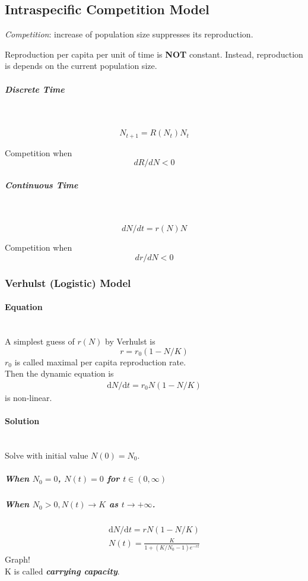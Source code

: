 \newpage
\subsection{Intraspecific Competition Model}

\emph{Competition}: increase of population size suppresses its reproduction.

\begin{assumption}
    Reproduction per capita per unit of time is \textbf{NOT} constant. Instead, reproduction is depends on the current population size.
\end{assumption}

\subparagraph{Discrete Time}~{
    $$
    N_{t+1} = R(N_t)N_t
    $$
    \par{Competition when}
    $$
    dR/dN <0
    $$
}
\subparagraph{Continuous Time}~{
    $$
    dN/dt = r(N)N
    $$
    \par{Competition when}
    $$
    dr/dN <0
    $$
}

\subsubsection{Verhulst (Logistic) Model}
\paragraph{Equation}~{}\\
A simplest guess of $r(N)$ by Verhulst is 
$$
r=r_{0}(1-N / K)
$$
$r_0$ is called maximal per capita reproduction rate.\\
Then the dynamic equation is
\begin{align}
    \mathrm{d} N / \mathrm{d} t=r_{0} N(1-N / K) \label{eq1.7}
\end{align}
 is non-linear.
\newpage
\paragraph{Solution}~{}\\
Solve  with initial value $N(0)=N_0$.
\subparagraph{When $N_0=0$, $N(t)=0$ for $t \in (0,\infty) $}
\subparagraph{When $N_0>0, N(t) \rightarrow K $ as $ t \rightarrow+\infty$.}
\begin{gather*}
    \mathrm{d} N / \mathrm{d} t=r N(1-N / K)\\
    N(t)=\frac{K}{1+\left(K / N_{0}-1\right) e^{-r t}}
\end{gather*}
Graph!\\
K is called \emph{\textbf{carrying capacity}}.

